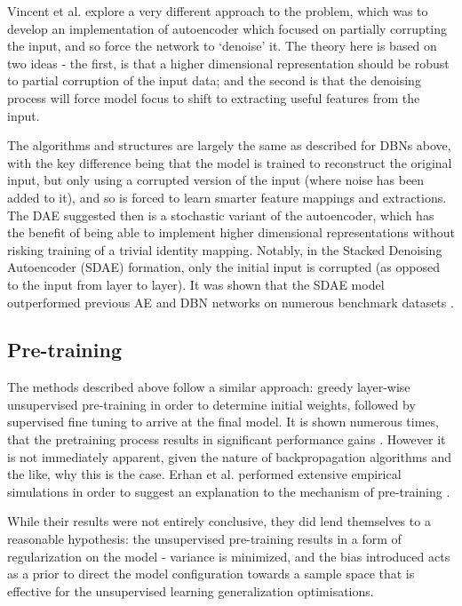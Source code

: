 \documentclass[a4paper,latin]{paper}
\begin{document}
Vincent et al. explore a very different approach to the problem, which was to develop an implementation of 
autoencoder which focused on partially corrupting the input, and so force the network to ‘denoise’ it. The theory 
here is based on two ideas - the first, is that a higher dimensional representation should be robust to partial 
corruption of the input data; and the second is that the denoising process will force model focus to shift to 
extracting useful features from the input.
 \hfill \break 

The algorithms and structures are largely the same as described for DBNs above, with the key difference 
being that the model is trained to reconstruct the original input, but only using a corrupted version of the input 
(where noise has been added to it), and so is forced to learn smarter feature mappings and extractions. 
The DAE suggested then is a stochastic variant of the autoencoder, which has the benefit of being able to 
implement higher dimensional representations without risking training of a trivial identity mapping. Notably, 
in the Stacked Denoising Autoencoder (SDAE) formation, only the initial input is corrupted (as opposed to the 
input from layer to layer). It was shown that the SDAE model outperformed previous AE and DBN networks on 
numerous benchmark datasets \cite{Vincent} . 

\subsection {Pre-training}

The methods described above follow a similar approach: greedy layer-wise unsupervised pre-training in order to 
determine initial weights, followed by supervised fine tuning to arrive at the final model. It is shown numerous times, 
that the pretraining process results in significant performance gains \cite{Vincent}. However it is not immediately apparent, 
given the nature of backpropagation algorithms and the like, why this is the case. Erhan et al. performed 
extensive empirical simulations in order to suggest an explanation to the mechanism of pre-training \cite{Erhan}.
 \hfill \break 

While their results were not entirely conclusive, they did lend themselves to a reasonable hypothesis: 
the unsupervised pre-training results in a form of regularization on the model - variance is minimized, and the 
bias introduced acts as a prior to direct the model configuration towards a sample space that is effective for the unsupervised 
learning generalization optimisations.
\end{document}
